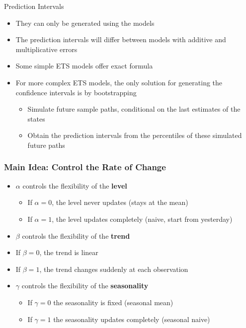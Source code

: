 \documentclass{beamer}
\begin{document}
\begin{frame}{Prediction Intervals}

  \begin{itemize}
  \item They can only be generated using the models
  \item The prediction intervals will differ between models with additive and multiplicative errors
  \item Some simple ETS models offer exact formula
  \item For more complex ETS models, the only solution for generating the confidence intervals is by bootstrapping
    \begin{itemize}
    \item Simulate future sample paths, conditional on the last estimates of the states
    \item Obtain the prediction intervals from the percentiles of these simulated future paths
    \end{itemize}
  \end{itemize}
  
\end{frame}





\begin{frame}
  \frametitle{Main Idea: Control the Rate of Change}

  \begin{itemize}
  \item $\alpha$ controls the flexibility of the \textbf{level}
    \begin{itemize}
    \item If $\alpha = 0$, the level never updates (stays at the mean)
    \item If $\alpha = 1$, the level updates completely (naive, start from yesterday)
    \end{itemize}
  \item $\beta$ controls the flexibility of the \textbf{trend}
    \item If $\beta = 0$, the trend is linear
    \item If $\beta = 1$, the trend changes suddenly at each observation
    
    \item $\gamma$ controls the flexibility of the \textbf{seasonality}
      \begin{itemize}
      \item If $\gamma = 0$ the seasonality is fixed (seasonal mean)
      \item If $\gamma = 1$ the seasonality updates completely (seasonal naive)        
      \end{itemize}
  \end{itemize}
  
\end{frame}
\end{document}
